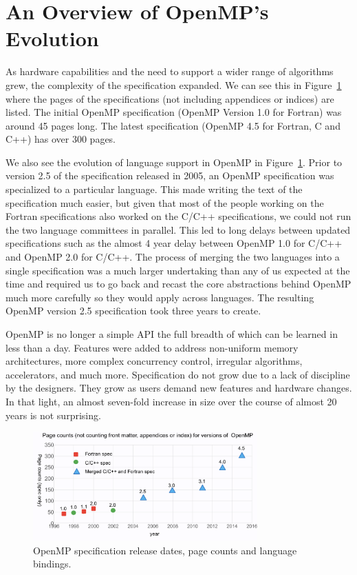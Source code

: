 \section{An Overview of OpenMP's Evolution}
\label{sec:evolve}

As hardware capabilities and the need to support a wider range of algorithms
grew, the complexity of the specification expanded.  We can see this in
Figure~\ref{omppcount} where the pages of the specifications (not including
appendices or indices) are listed.   The initial OpenMP specification (OpenMP
Version 1.0 for Fortran) was around 45 pages long.  The  latest specification
(OpenMP 4.5 for Fortran, C and C++)  has over 300 pages.

We also see the evolution of language support in OpenMP in
Figure~\ref{omppcount}.  Prior to version 2.5 of the specification released in
2005, an OpenMP specification was specialized to a particular language.   This
made writing the text of the specification much easier, but given that most of
the people working on the Fortran specifications also worked on the C/C++
specifications, we could not run the two language committees in parallel.  This
led to long delays between updated specifications such as the almost 4 year
delay between OpenMP 1.0 for C/C++ and OpenMP 2.0 for C/C++.  The process of
merging the two languages into a single specification was a much larger
undertaking than any of us expected at the time and required us to go back and
recast the core abstractions behind OpenMP much more carefully so they would
apply across languages.  The resulting OpenMP version 2.5 specification took
three years to create.

OpenMP is no longer a simple API the full breadth of which can be learned in
less than a day.  Features were added to address non-uniform memory
architectures, more complex concurrency control, irregular algorithms,
accelerators, and much more.   Specification do not grow due to a lack of
discipline by the designers.  They grow as users demand new features and
hardware changes.  In that light, an almost seven-fold increase in size over the
course of almost 20 years is not surprising.

\begin{figure}
  \centering
  \includegraphics[width=3.4in]{pics/opcounts.png}
  \caption{OpenMP specification release dates, page counts and language bindings.}
  \label{omppcount}
\end{figure}


